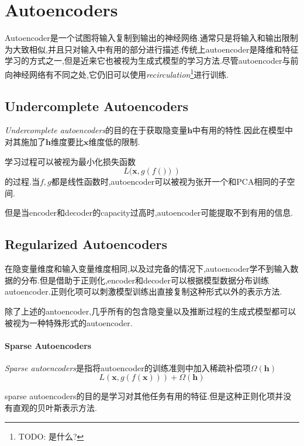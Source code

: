 \chapter{Autoencoders}

Autoencoder是一个试图将输入复制到输出的神经网络.通常只是将输入和输出限制为大致相似,并且只对输入中有用的部分进行描述.传统上autoencoder是降维和特征学习的方式之一,但是近来它也被视为生成式模型的学习方法.尽管autoencoder与前向神经网络有不同之处,它仍旧可以使用\textit{recirculation}\footnote{TODO: 是什么?}进行训练.

\section{Undercomplete Autoencoders}

\textit{Undercomplete autoencoders}的目的在于获取隐变量$\mathbf h$中有用的特性.因此在模型中对其施加了$\mathbf h$维度要比$\mathbf x$维度低的限制.

学习过程可以被视为最小化损失函数
\begin{equation}
L(\mathbf x,g(f(\mathbf)))
\end{equation}
的过程.当$f,g$都是线性函数时,autoencoder可以被视为张开一个和PCA相同的子空间.

但是当encoder和decoder的capacity过高时,autoencoder可能提取不到有用的信息.

\section{Regularized Autoencoders}

在隐变量维度和输入变量维度相同,以及过完备的情况下,autoencoder学不到输入数据的分布.但是借助于正则化,encoder和decoder可以根据模型数据分布训练autoencoder.正则化项可以刺激模型训练出直接复制这种形式以外的表示方法.

除了上述的antoencoder,几乎所有的包含隐变量以及推断过程的生成式模型都可以被视为一种特殊形式的autoencoder.

\subsubsection{Sparse Autoencoders}

\textit{Sparse autoencoders}是指将autoencoder的训练准则中加入稀疏补偿项$\Omega(\mathbf h)$
\begin{equation}
L(\mathbf x,g(f(\mathbf x)))+\Omega(\mathbf h)
\end{equation}

sparse autoencoders的目的是学习对其他任务有用的特征.但是这种正则化项并没有直观的贝叶斯表示方法.

